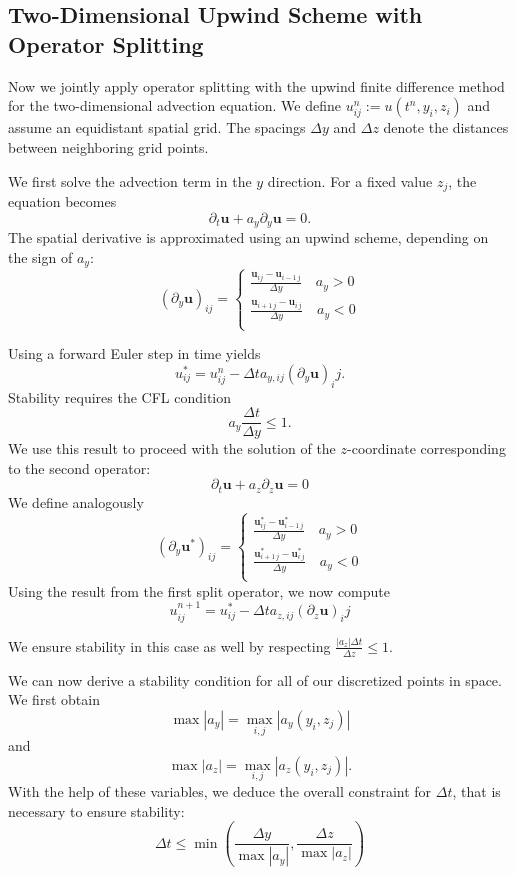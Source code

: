 \subsection{Two-Dimensional Upwind Scheme with Operator Splitting}\label{2DUpwind}
Now we jointly apply operator splitting with the upwind finite difference
method for the two-dimensional advection equation. We define $u_{ij}^n
:= u(t^n, y_i, z_i)$ and assume an equidistant spatial grid. The spacings
$\Delta y$ and $\Delta z$ denote the distances between neighboring grid
points.

We first solve the advection term in the $y$ direction. For a fixed value
$z_j$, the equation becomes
$$\partial_t \bm{u} + a_y\partial_y \bm{u} = 0.$$
The spatial derivative is approximated using an upwind scheme,
depending on the sign of $a_y$:
\[
(\partial_y\bm{u})_{ij}=
\begin{cases}
    \frac{\bm{u}_{ij}-\bm{u}_{i-1 \,j}}{\Delta y} \quad a_y > 0 \\
     \frac{\bm{u}_{i+1\,j}-\bm{u}_{i\,j}}{\Delta y} \quad a_y < 0 \\
\end{cases}
\]

Using a forward Euler step in time yields
$$u_{ij}^*= u_{ij}^n - \Delta t a_{y,ij}(\partial_y \bm{u})_ij.$$
Stability requires the CFL condition
$$a_y\frac{\Delta t}{\Delta y}\leq 1.$$
We use this result to proceed with the solution of the $z$-coordinate
corresponding to the second operator:
$$\partial_t \bm{u} + a_z\partial_z \bm{u} = 0$$
We define analogously
\[
(\partial_y\bm{u}^*)_{ij}=
\begin{cases}
    \frac{\bm{u}^*_{ij}-\bm{u}^*_{i-1 \,j}}{\Delta y} \quad a_y > 0 \\
     \frac{\bm{u}^*_{i+1\,j}-\bm{u}^*_{i\,j}}{\Delta y} \quad a_y < 0 \\
\end{cases}
\]
Using the result from the first split operator, we now compute
$$u_{ij}^{n+1}= u_{ij}^* - \Delta t a_{z,ij}(\partial_z \bm{u})_ij$$

We ensure stability in this case as well by respecting $\frac{|a_z|
\Delta t}{\Delta z}\leq 1$.

We can now derive a stability condition for all of our discretized points
in space. We first obtain
$$\max |a_y|= \max_{i,j}|a_y(y_i,z_j)|$$
and 
$$\max |a_z|= \max_{i,j}|a_z(y_i,z_j)|.$$
With the help of these variables, we deduce the overall constraint for
$\Delta t$, that is necessary to ensure stability:
$$ \Delta t \leq \min{\left(\frac{\Delta y}{\max|a_y|}, 
\frac{\Delta z}{\max|a_z|}\right)}$$

